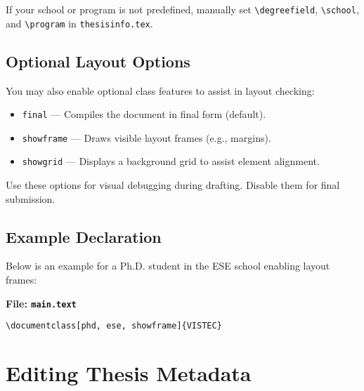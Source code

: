 \begin{subparagraph}
If your school or program is not predefined, manually set \verb|\degreefield|, \verb|\school|, and \verb|\program| in \texttt{thesisinfo.tex}.
\end{subparagraph}

\subsection{Optional Layout Options}
\label{ch3:class-optional}

\begin{subparagraph}
You may also enable optional class features to assist in layout checking:
\end{subparagraph}

\begin{itemize}[leftmargin=\subparitemindent]
  \item \texttt{final} — Compiles the document in final form (default).
  \item \texttt{showframe} — Draws visible layout frames (e.g., margins).
  \item \texttt{showgrid} — Displays a background grid to assist element alignment.
\end{itemize}

\begin{subparagraph}
Use these options for visual debugging during drafting. Disable them for final submission.
\end{subparagraph}

\subsection{Example Declaration}
\label{ch3:class-example}

\begin{subparagraph}
Below is an example for a Ph.D. student in the ESE school enabling layout frames:
\end{subparagraph}
\newpage
\noindent\textbf{File: \texttt{main.text}}\vspace{-1em}
\begin{verbatim}
\documentclass[phd, ese, showframe]{VISTEC}
\end{verbatim}

\section{Editing Thesis Metadata}
\label{ch3:metadata}

